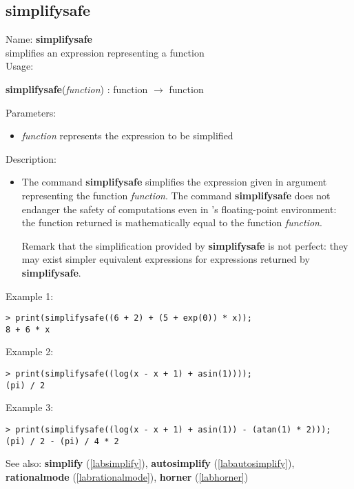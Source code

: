 \subsection{simplifysafe}
\label{labsimplifysafe}
\noindent Name: \textbf{simplifysafe}\\
simplifies an expression representing a function\\
\noindent Usage: 
\begin{center}
\textbf{simplifysafe}(\emph{function}) : \textsf{function} $\rightarrow$ \textsf{function}\\
\end{center}
Parameters: 
\begin{itemize}
\item \emph{function} represents the expression to be simplified
\end{itemize}
\noindent Description: \begin{itemize}

\item The command \textbf{simplifysafe} simplifies the expression given in argument
   representing the function \emph{function}.  The command \textbf{simplifysafe} does not
   endanger the safety of computations even in \sollya's floating-point
   environment: the function returned is mathematically equal to the
   function \emph{function}. 
    
   Remark that the simplification provided by \textbf{simplifysafe} is not perfect:
   they may exist simpler equivalent expressions for expressions returned
   by \textbf{simplifysafe}.
\end{itemize}
\noindent Example 1: 
\begin{center}\begin{minipage}{15cm}\begin{Verbatim}[frame=single]
> print(simplifysafe((6 + 2) + (5 + exp(0)) * x));
8 + 6 * x
\end{Verbatim}
\end{minipage}\end{center}
\noindent Example 2: 
\begin{center}\begin{minipage}{15cm}\begin{Verbatim}[frame=single]
> print(simplifysafe((log(x - x + 1) + asin(1))));
(pi) / 2
\end{Verbatim}
\end{minipage}\end{center}
\noindent Example 3: 
\begin{center}\begin{minipage}{15cm}\begin{Verbatim}[frame=single]
> print(simplifysafe((log(x - x + 1) + asin(1)) - (atan(1) * 2)));
(pi) / 2 - (pi) / 4 * 2
\end{Verbatim}
\end{minipage}\end{center}
See also: \textbf{simplify} (\ref{labsimplify}), \textbf{autosimplify} (\ref{labautosimplify}), \textbf{rationalmode} (\ref{labrationalmode}), \textbf{horner} (\ref{labhorner})
